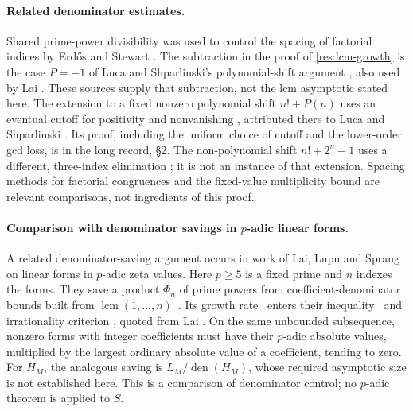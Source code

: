 \documentclass[11pt]{article}
\begin{document}
\paragraph{Related denominator estimates.}
Shared prime-power divisibility was used to control the spacing of
factorial indices by Erd\H{o}s and Stewart
\cite[\S3, pp.~516--517]{erdos-stewart1976}. The subtraction in the proof of
\eqref{res:lcm-growth} is the case $P=-1$ of Luca and Shparlinski's
polynomial-shift argument \cite[proof of Lemma~5, p.~811]{luca-shparlinski},
also used by Lai \cite[proof of Lemma~2.4, display~(2.5)]{lai}.
These sources supply that subtraction, not the lcm asymptotic stated here.
The extension to a fixed nonzero polynomial shift $n!+P(n)$ uses an
eventual cutoff for positivity and nonvanishing
\cite[Lemma~2.1]{lai}, attributed there to Luca and Shparlinski
\cite{luca-shparlinski}. Its proof, including the uniform choice of cutoff
and the lower-order gcd loss, is in the long record, \S2.
The non-polynomial shift $n!+2^n-1$ uses a different, three-index elimination
\cite[Lemmas~2.1--2.3]{luca-shparlinski-exp}; it is not an instance of that
extension.
Spacing methods for factorial congruences
\cite[Lemma~2]{stewart2004} and the fixed-value multiplicity bound
\cite[arXiv v1, Theorem~12, p.~16]{garaev-luca-shparlinski}
are relevant comparisons, not ingredients of this proof.

\paragraph{Comparison with denominator savings in $p$-adic linear forms.}
A related denominator-saving argument occurs in work of Lai, Lupu and
Sprang on linear forms in $p$-adic zeta values. Here $p\ge5$ is a fixed
prime and $n$ indexes the forms.
They save a product $\Phi_n$ of prime powers from coefficient-denominator
bounds built from $\operatorname{lcm}(1,\ldots,n)$~\cite[\S5]{lai-lupu-sprang}.
Its growth rate~\cite[Lemma~7.3]{lai-lupu-sprang} enters their
inequality~\cite[(8.1)]{lai-lupu-sprang} and irrationality criterion
\cite[Lemma~2.1, p.~3]{lai-lupu-sprang}, quoted from Lai
\cite[Lemma~2.1, p.~4]{lai-2adic}. On the same unbounded subsequence,
nonzero forms with integer coefficients must have their $p$-adic absolute
values, multiplied by the largest ordinary absolute value of a coefficient,
tending to zero. For $H_M$, the analogous saving is
$L_M/\operatorname{den}(H_M)$, whose required asymptotic size is not established
here. This is a comparison of denominator control; no $p$-adic theorem is
applied to $S$.
\end{document}
